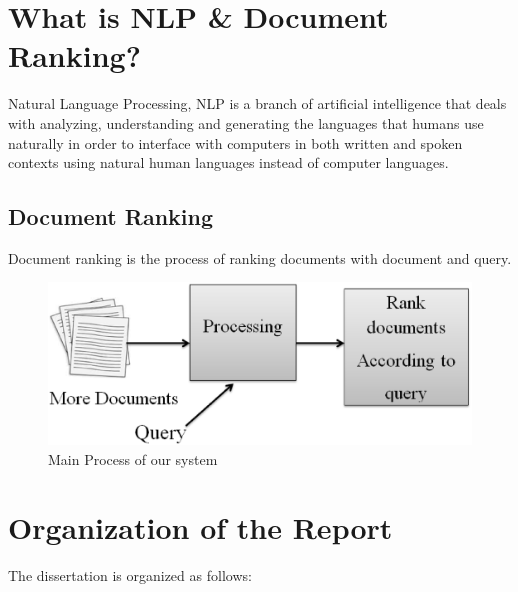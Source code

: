 \section{What is NLP \& Document Ranking?}

Natural Language Processing, NLP is a branch of artificial intelligence that deals with analyzing, understanding and generating the languages that humans use naturally in order to interface with computers in both written and spoken contexts using natural human languages instead of computer languages.

\subsection{Document Ranking}

Document ranking is the process of ranking documents with document and query.

\begin{figure}[htp]
	\centering
		\includegraphics[width=.65\textwidth]{figure/one.eps}
	\caption{Main Process of our system}
	\label{Figure:process}
\end{figure}





\section{Organization of the Report}
%
The dissertation is organized as follows: 

